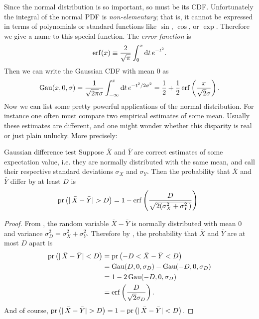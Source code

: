Since the normal distribution is so important, so must be its CDF.
Unfortunately the integral of the normal PDF is {\it non-elementary};
 that is, it cannot be expressed in terms of 
polynomials or standard
functions like $\sin$, $\cos$, or $\exp$. Therefore we give a name
to this special function.
The {\it error function} is
\begin{equation}
  \erf(x)\equiv\frac{2}{\sqrt{\pi}}\int_0^x\dd{t}e^{-t^2}.
\end{equation}
Then we can write the Gaussian CDF with mean 0 as
\begin{equation}
  \label{eq:gaussCDF}
  \Gau(x,0,\sigma)=\frac{1}{\sqrt{2\pi}\sigma}
                   \int_{-\infty}^x\dd{t}e^{-t^2/2\sigma^2}
                  =\frac{1}{2}+\frac{1}{2}
                   \erf\left(\frac{x}{\sqrt{2}\sigma}\right).
\end{equation}
Now we can list some pretty powerful applications of the normal distribution.
For instance one often must compare two empirical estimates of some mean.
Usually these estimates are different, and one might wonder whether this
disparity is real or just plain unlucky. More precisely:
\begin{theorem}{Gaussian difference test}{}\label{thm:gaudif}
  Suppose $\bar{X}$ and $\bar{Y}$ are correct estimates of 
  some expectation
  value, i.e. they are normally distributed with the same mean, and call
  their respective standard deviations $\sigma_X$ and
  $\sigma_Y$. Then the probability that $\bar{X}$ 
  and $\bar{Y}$ differ by at least $D$ is
  \begin{equation*}
    \pr{|\,\bar{X}-\bar{Y}|>D}=1-\erf\left(\frac{D}
       {\sqrt{2(\sigma_X^2+\sigma_Y^2)}}\right).
  \end{equation*}
  \begin{proof}
    From , the random variable
    $\bar{X}-\bar{Y}$ is normally distributed with mean 0 
    and variance $\sigma_D^2=\sigma_X^2+\sigma_Y^2$. Therefore by
    , the probability that $\bar{X}$ and 
    $\bar{Y}$ are at most $D$ apart is
    \begin{equation*}
      \begin{aligned}
        \pr{|\,\bar{X}-\bar{Y}|<D}
            &=\pr{-D<\bar{X}-\bar{Y}<D}\\
            &=\Gau(D,0,\sigma_D)-\Gau(-D,0,\sigma_D)\\
            &=1-2\Gau(-D,0,\sigma_D)\\
            &=\erf\left(\frac{D}{\sqrt{2}\sigma_D}\right).
      \end{aligned}
    \end{equation*}
    And of course, $\pr{|\,\bar{X}-\bar{Y}|>D}
     =1-\pr{|\,\bar{X}-\bar{Y}|<D}$.
  \end{proof}
\end{theorem}
